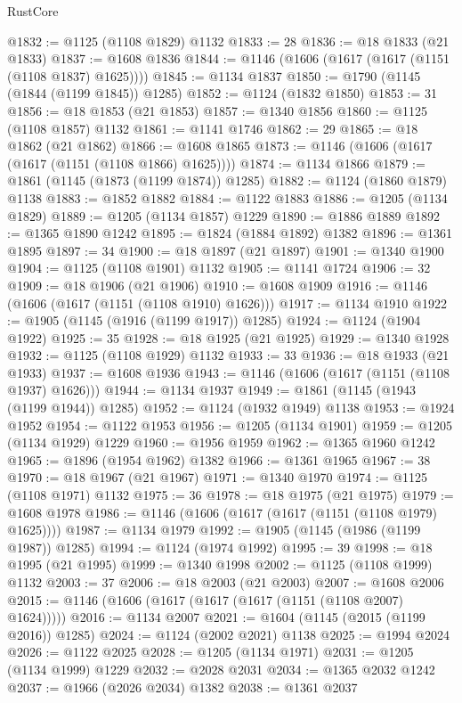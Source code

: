 \begin{lexlean}{RustCore}
\begin{coremodule}
@1832 := @1125 (@1108 @1829) @1132
@1833 := 28
@1836 := @18 @1833 (@21 @1833)
@1837 := @1608 @1836
@1844 := @1146 (@1606 (@1617 (@1617 (@1151 (@1108 @1837) @1625))))
@1845 := @1134 @1837
@1850 := @1790 (@1145 (@1844 (@1199 @1845)) @1285)
@1852 := @1124 (@1832 @1850)
@1853 := 31
@1856 := @18 @1853 (@21 @1853)
@1857 := @1340 @1856
@1860 := @1125 (@1108 @1857) @1132
@1861 := @1141 @1746
@1862 := 29
@1865 := @18 @1862 (@21 @1862)
@1866 := @1608 @1865
@1873 := @1146 (@1606 (@1617 (@1617 (@1151 (@1108 @1866) @1625))))
@1874 := @1134 @1866
@1879 := @1861 (@1145 (@1873 (@1199 @1874)) @1285)
@1882 := @1124 (@1860 @1879) @1138
@1883 := @1852 @1882
@1884 := @1122 @1883
@1886 := @1205 (@1134 @1829)
@1889 := @1205 (@1134 @1857) @1229
@1890 := @1886 @1889
@1892 := @1365 @1890 @1242
@1895 := @1824 (@1884 @1892) @1382
@1896 := @1361 @1895
@1897 := 34
@1900 := @18 @1897 (@21 @1897)
@1901 := @1340 @1900
@1904 := @1125 (@1108 @1901) @1132
@1905 := @1141 @1724
@1906 := 32
@1909 := @18 @1906 (@21 @1906)
@1910 := @1608 @1909
@1916 := @1146 (@1606 (@1617 (@1151 (@1108 @1910) @1626)))
@1917 := @1134 @1910
@1922 := @1905 (@1145 (@1916 (@1199 @1917)) @1285)
@1924 := @1124 (@1904 @1922)
@1925 := 35
@1928 := @18 @1925 (@21 @1925)
@1929 := @1340 @1928
@1932 := @1125 (@1108 @1929) @1132
@1933 := 33
@1936 := @18 @1933 (@21 @1933)
@1937 := @1608 @1936
@1943 := @1146 (@1606 (@1617 (@1151 (@1108 @1937) @1626)))
@1944 := @1134 @1937
@1949 := @1861 (@1145 (@1943 (@1199 @1944)) @1285)
@1952 := @1124 (@1932 @1949) @1138
@1953 := @1924 @1952
@1954 := @1122 @1953
@1956 := @1205 (@1134 @1901)
@1959 := @1205 (@1134 @1929) @1229
@1960 := @1956 @1959
@1962 := @1365 @1960 @1242
@1965 := @1896 (@1954 @1962) @1382
@1966 := @1361 @1965
@1967 := 38
@1970 := @18 @1967 (@21 @1967)
@1971 := @1340 @1970
@1974 := @1125 (@1108 @1971) @1132
@1975 := 36
@1978 := @18 @1975 (@21 @1975)
@1979 := @1608 @1978
@1986 := @1146 (@1606 (@1617 (@1617 (@1151 (@1108 @1979) @1625))))
@1987 := @1134 @1979
@1992 := @1905 (@1145 (@1986 (@1199 @1987)) @1285)
@1994 := @1124 (@1974 @1992)
@1995 := 39
@1998 := @18 @1995 (@21 @1995)
@1999 := @1340 @1998
@2002 := @1125 (@1108 @1999) @1132
@2003 := 37
@2006 := @18 @2003 (@21 @2003)
@2007 := @1608 @2006
@2015 := @1146 (@1606 (@1617 (@1617 (@1617 (@1151 (@1108 @2007) @1624)))))
@2016 := @1134 @2007
@2021 := @1604 (@1145 (@2015 (@1199 @2016)) @1285)
@2024 := @1124 (@2002 @2021) @1138
@2025 := @1994 @2024
@2026 := @1122 @2025
@2028 := @1205 (@1134 @1971)
@2031 := @1205 (@1134 @1999) @1229
@2032 := @2028 @2031
@2034 := @1365 @2032 @1242
@2037 := @1966 (@2026 @2034) @1382
@2038 := @1361 @2037

\end{coremodule}
\end{lexlean}

